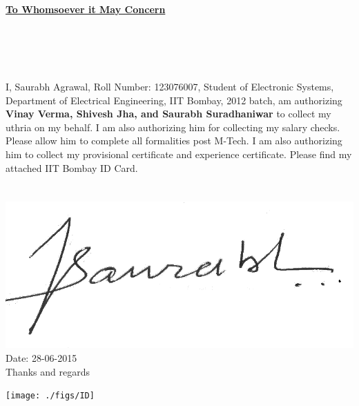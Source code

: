 \documentclass[12pt,a4paper]{letter}
\begin{document}
\begin{centering}
\huge
\textbf{\underline{To Whomsoever it May Concern}}
\end{centering}\\ \\ \\ \\ 

I, Saurabh Agrawal, Roll Number: 123076007, Student of Electronic Systems, Department of Electrical Engineering, IIT Bombay, 2012 batch, am authorizing \textbf{Vinay Verma, Shivesh Jha, and Saurabh Suradhaniwar} to collect my uthria on my behalf. I am also authorizing him for collecting my salary checks. Please allow him to complete all formalities post M-Tech.  I am also authorizing him to collect my provisional certificate and experience certificate. Please find my attached IIT Bombay ID Card.\\ \\ \\ 

\flushleft
\includegraphics[scale=0.25]{./figs/signature}\\
Date: 28-06-2015\\
Thanks and regards
\vspace{1cm}


\texttt{[image: ./figs/ID]}\\
\end{document}
